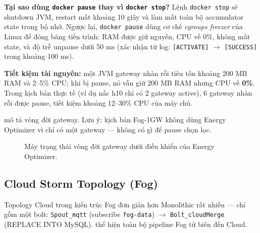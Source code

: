 \documentclass[13pt,a4paper]{report}
\newcommand{\code}[1]{\texttt{\small #1}}
\begin{document}
\textbf{Tại sao dùng \code{docker pause} thay vì \code{docker stop}?} Lệnh
\code{docker stop} sẽ shutdown JVM, restart mất khoảng 10 giây và làm mất toàn bộ
accumulator state trong bộ nhớ. Ngược lại, \code{docker pause} dùng cơ chế
\textit{cgroups freezer} của Linux để đóng băng tiến trình: RAM được giữ nguyên,
CPU về 0\%, không mất state, và độ trễ unpause dưới 50 ms (xác nhận từ log:
\code{[ACTIVATE]} $\to$ \code{[SUCCESS]} trong khoảng 100 ms).

\textbf{Tiết kiệm tài nguyên:} một JVM gateway nhàn rỗi tiêu tốn khoảng 200 MB
RAM và 2--5\% CPU; khi bị pause, nó vẫn giữ 200 MB RAM nhưng CPU về \textbf{0\%}.
Trong kịch bản thực tế (ví dụ nấc h10 chỉ có 2 gateway active), 6 gateway nhàn rỗi
được pause, tiết kiệm khoảng 12--30\% CPU của máy chủ.

 mô tả vòng đời gateway. Lưu ý: kịch bản Fog-1GW không dùng
Energy Optimizer vì chỉ có một gateway --- không có gì để pause chọn lọc.

\begin{figure}[H]
\centering
{}
\caption{Máy trạng thái vòng đời gateway dưới điều khiển của Energy Optimizer.}
\label{fig:gw-life}
\end{figure}

\subsection{Cloud Storm Topology (Fog)}

Topology Cloud trong kiến trúc Fog đơn giản hơn Monolithic rất nhiều --- chỉ gồm
một bolt: \code{Spout\_mqtt} (subscribe \code{fog-data}) $\to$
\code{Bolt\_cloudMerge} (REPLACE INTO MySQL).  thể hiện toàn bộ
pipeline Fog từ biên đến Cloud.
\end{document}
